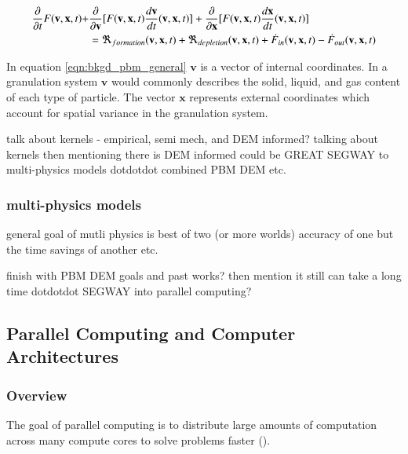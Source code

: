 \documentclass[preprint,11pt,authoryear]{elsarticle}
\begin{document}
    \begin{align}
    \frac{ \partial}{\partial t}F(\textbf{v},\textbf{x},t) +& \frac{\partial}{\partial \textbf{v}}[F(\textbf{v},\textbf{x},t)\frac{d\textbf{v}}{dt}(\textbf{v},\textbf{x},t)] + \frac{\partial}{\partial \textbf{x}}[F(\textbf{v},\textbf{x},t)\frac{d\textbf{x}}{dt}(\textbf{v},\textbf{x},t)] \notag\\
    &= \Re_{formation}(\textbf{v},\textbf{x},t)+\Re_{depletion}(\textbf{v},\textbf{x},t)+\dot{F}_{in}(\textbf{v},\textbf{x},t)-\dot{F}_{out}(\textbf{v},\textbf{x},t)
    \label{eqn:bkgd_pbm_general} 
    \end{align}
    
    \par In equation \ref{eqn:bkgd_pbm_general} $\textbf{v}$ is a vector of internal coordinates. In a granulation system $\textbf{v}$ would commonly describes the solid, liquid, and gas content of each type of particle. The vector $\textbf{x}$ represents external coordinates which account for spatial variance in the granulation system. 
      
    \par talk about kernels - empirical, semi mech, and DEM informed? talking about kernels then mentioning there is DEM informed could be GREAT SEGWAY to multi-physics models dotdotdot combined PBM DEM etc. 
    

    \subsubsection{multi-physics models}
	\par general goal of mutli physics is best of two (or more worlds) accuracy of one but the time savings of another etc. 
	
	
	\par finish with PBM DEM goals and past works? then mention it still can take a long time dotdotdot SEGWAY into parallel computing?


  \subsection{Parallel Computing and Computer Architectures}
    \subsubsection{Overview}
    \par The goal of parallel computing is to distribute large amounts of computation across many compute cores to solve problems faster (\cite{wilkinson2005}).
\end{document}
